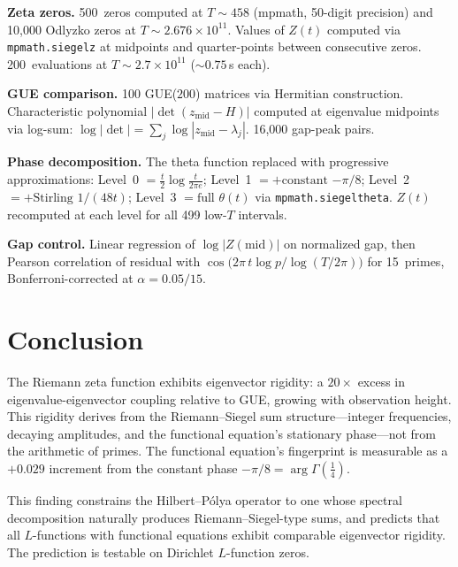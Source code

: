 \documentclass[11pt,a4paper]{article}
\begin{document}
\textbf{Zeta zeros.}
500~zeros computed at $T \sim 458$ (mpmath, 50-digit precision) and 10{,}000 Odlyzko zeros at $T \sim 2.676 \times 10^{11}$.
Values of $Z(t)$ computed via \texttt{mpmath.siegelz} at midpoints and quarter-points between consecutive zeros.
200~evaluations at $T \sim 2.7 \times 10^{11}$ (${\sim}0.75$\,s each).

\textbf{GUE comparison.}
100 GUE($200$) matrices via Hermitian construction.
Characteristic polynomial $|\det(z_{\mathrm{mid}} - H)|$ computed at eigenvalue midpoints via log-sum: $\log|\det| = \sum_j \log|z_{\mathrm{mid}} - \lambda_j|$.
16{,}000 gap-peak pairs.

\textbf{Phase decomposition.}
The theta function replaced with progressive approximations:
Level~0 $= \tfrac{t}{2}\log\tfrac{t}{2\pi e}$;
Level~1 $= {+}\text{constant } {-\pi/8}$;
Level~2 $= {+}\text{Stirling } 1/(48t)$;
Level~3 $= \text{full } \theta(t)$ via \texttt{mpmath.siegeltheta}.
$Z(t)$ recomputed at each level for all 499 low-$T$ intervals.

\textbf{Gap control.}
Linear regression of $\log|Z(\mathrm{mid})|$ on normalized gap, then Pearson correlation of residual with $\cos\!\bigl(2\pi\,t\log p / \log(T/2\pi)\bigr)$ for 15~primes, Bonferroni-corrected at $\alpha = 0.05/15$.

\section{Conclusion}

The Riemann zeta function exhibits eigenvector rigidity: a $20\times$ excess in eigenvalue-eigenvector coupling relative to GUE, growing with observation height.
This rigidity derives from the Riemann--Siegel sum structure---integer frequencies, decaying amplitudes, and the functional equation's stationary phase---not from the arithmetic of primes.
The functional equation's fingerprint is measurable as a $+0.029$ increment from the constant phase $-\pi/8 = \arg\Gamma(\tfrac{1}{4})$.

This finding constrains the Hilbert--P\'olya operator to one whose spectral decomposition naturally produces Riemann--Siegel-type sums, and predicts that all $L$-functions with functional equations exhibit comparable eigenvector rigidity.
The prediction is testable on Dirichlet $L$-function zeros.

\end{document}
